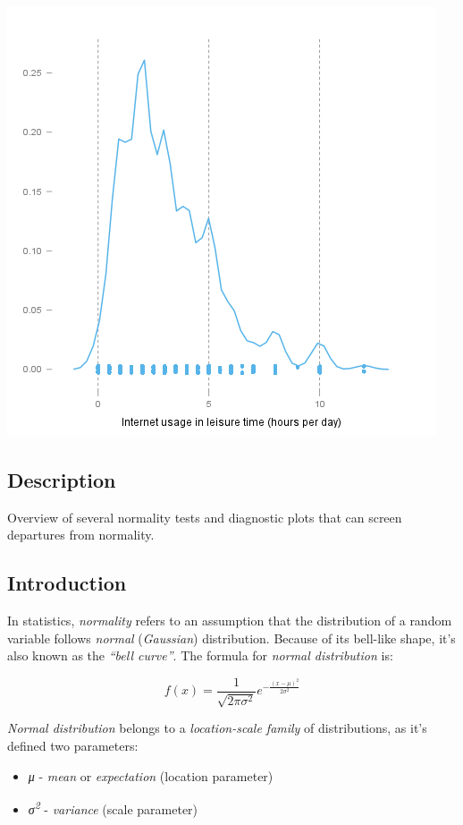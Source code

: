 \documentclass[]{article}
\makeatletter
\def\maxwidth{\ifdim\Gin@nat@width>\linewidth\linewidth
\else\Gin@nat@width\fi}
\let\Oldincludegraphics\includegraphics
\renewcommand{\includegraphics}[1]{\Oldincludegraphics[width=\maxwidth]{#1}}
\makeatother
\begin{document}
\href{d6afe5eede3603d041ec8dd001c5280d-hires.png}{\includegraphics{d6afe5eede3603d041ec8dd001c5280d.png}}

\subsection{Description}

Overview of several normality tests and diagnostic plots that can screen
departures from normality.

\subsection{Introduction}

In statistics, \emph{normality} refers to an assumption that the
distribution of a random variable follows \emph{normal}
(\emph{Gaussian}) distribution. Because of its bell-like shape, it's
also known as the \emph{``bell curve''}. The formula for \emph{normal
distribution} is:

\[f(x) = \frac{1}{\sqrt{2\pi{}\sigma{}^2}} e^{-\frac{(x-\mu{})^2}{2\sigma{}^2}}\]

\emph{Normal distribution} belongs to a \emph{location-scale family} of
distributions, as it's defined two parameters:

\begin{itemize}
\item
  \emph{μ} - \emph{mean} or \emph{expectation} (location parameter)
\item
  \emph{σ\textsuperscript{2}} - \emph{variance} (scale parameter)
\end{itemize}
\end{document}
